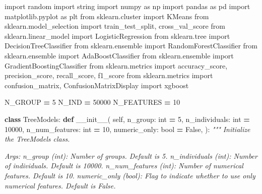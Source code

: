 \documentclass[
]{book}
\newenvironment{Shaded}{\begin{snugshade}}{\end{snugshade}}
\newcommand{\BuiltInTok}[1]{#1}
\newcommand{\CommentTok}[1]{\textcolor[rgb]{0.56,0.35,0.01}{\textit{#1}}}
\newcommand{\DecValTok}[1]{\textcolor[rgb]{0.00,0.00,0.81}{#1}}
\newcommand{\FunctionTok}[1]{\textcolor[rgb]{0.00,0.00,0.00}{#1}}
\newcommand{\ImportTok}[1]{#1}
\newcommand{\KeywordTok}[1]{\textcolor[rgb]{0.13,0.29,0.53}{\textbf{#1}}}
\newcommand{\NormalTok}[1]{#1}
\newcommand{\OperatorTok}[1]{\textcolor[rgb]{0.81,0.36,0.00}{\textbf{#1}}}
\newcommand{\VariableTok}[1]{\textcolor[rgb]{0.00,0.00,0.00}{#1}}
\theoremstyle{definition}
\theoremstyle{definition}
\theoremstyle{definition}
\theoremstyle{definition}
\theoremstyle{remark}
\begin{document}
\begin{Shaded}
\begin{Highlighting}[]
\ImportTok{import}\NormalTok{ random}
\ImportTok{import}\NormalTok{ string}
\ImportTok{import}\NormalTok{ numpy }\ImportTok{as}\NormalTok{ np}
\ImportTok{import}\NormalTok{ pandas }\ImportTok{as}\NormalTok{ pd}
\ImportTok{import}\NormalTok{ matplotlib.pyplot }\ImportTok{as}\NormalTok{ plt}
\ImportTok{from}\NormalTok{ sklearn.cluster }\ImportTok{import}\NormalTok{ KMeans}
\ImportTok{from}\NormalTok{ sklearn.model\_selection }\ImportTok{import}\NormalTok{ train\_test\_split, cross\_val\_score}
\ImportTok{from}\NormalTok{ sklearn.linear\_model }\ImportTok{import}\NormalTok{ LogisticRegression}
\ImportTok{from}\NormalTok{ sklearn.tree }\ImportTok{import}\NormalTok{ DecisionTreeClassifier}
\ImportTok{from}\NormalTok{ sklearn.ensemble }\ImportTok{import}\NormalTok{ RandomForestClassifier}
\ImportTok{from}\NormalTok{ sklearn.ensemble }\ImportTok{import}\NormalTok{ AdaBoostClassifier}
\ImportTok{from}\NormalTok{ sklearn.ensemble }\ImportTok{import}\NormalTok{ GradientBoostingClassifier}
\ImportTok{from}\NormalTok{ sklearn.metrics }\ImportTok{import}\NormalTok{ accuracy\_score, precision\_score, recall\_score, f1\_score}
\ImportTok{from}\NormalTok{ sklearn.metrics }\ImportTok{import}\NormalTok{ confusion\_matrix, ConfusionMatrixDisplay}
\ImportTok{import}\NormalTok{ xgboost}

\NormalTok{N\_GROUP }\OperatorTok{=} \DecValTok{5}
\NormalTok{N\_IND }\OperatorTok{=} \DecValTok{50000}
\NormalTok{N\_FEATURES }\OperatorTok{=} \DecValTok{10}


\KeywordTok{class}\NormalTok{ TreeModels:}
    \KeywordTok{def} \FunctionTok{\_\_init\_\_}\NormalTok{(}
            \VariableTok{self}\NormalTok{,}
\NormalTok{            n\_group: }\BuiltInTok{int} \OperatorTok{=} \DecValTok{5}\NormalTok{,}
\NormalTok{            n\_individuals: }\BuiltInTok{int} \OperatorTok{=} \DecValTok{10000}\NormalTok{,}
\NormalTok{            n\_num\_features: }\BuiltInTok{int} \OperatorTok{=} \DecValTok{10}\NormalTok{,}
\NormalTok{            numeric\_only: }\BuiltInTok{bool} \OperatorTok{=} \VariableTok{False}\NormalTok{,}
\NormalTok{    ):}
        \CommentTok{"""}
\CommentTok{        Initialize the TreeModels class.}

\CommentTok{        Args:}
\CommentTok{            n\_group (int): Number of groups. Default is 5.}
\CommentTok{            n\_individuals (int): Number of individuals. Default is 10000.}
\CommentTok{            n\_num\_features (int): Number of numerical features. Default is 10.}
\CommentTok{            numeric\_only (bool): Flag to indicate whether to use only numerical features. Default is False.}


\end{Highlighting}
\end{Shaded}
\end{document}
